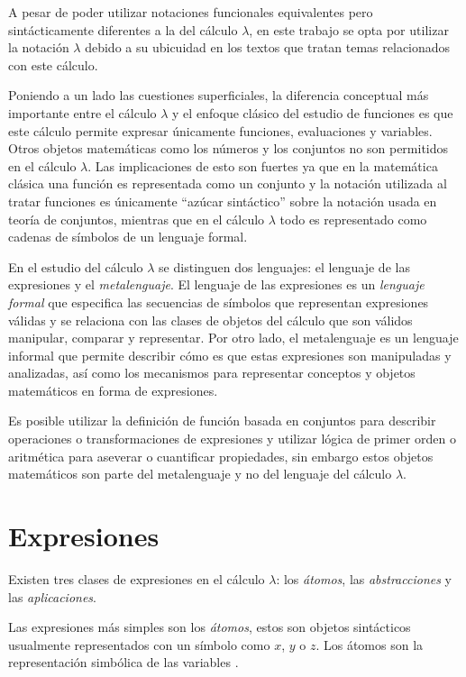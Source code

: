 A pesar de poder utilizar notaciones funcionales equivalentes pero sintácticamente diferentes a la del cálculo \( λ \), en este trabajo se opta por utilizar la notación \( λ \) debido a su ubicuidad en los textos que tratan temas relacionados con este cálculo.

Poniendo a un lado las cuestiones superficiales, la diferencia conceptual más importante entre el cálculo \( λ \) y el enfoque clásico del estudio de funciones es que este cálculo permite expresar únicamente funciones, evaluaciones y variables. Otros objetos matemáticas como los números y los conjuntos no son permitidos en el cálculo \( λ \). Las implicaciones de esto son fuertes ya que en la matemática clásica una función es representada como un conjunto y la notación utilizada al tratar funciones es únicamente ``azúcar sintáctico'' sobre la notación usada en teoría de conjuntos, mientras que en el cálculo \( λ \) todo es representado como cadenas de símbolos de un lenguaje formal.

En el estudio del cálculo \( λ \) se distinguen dos lenguajes: el lenguaje de las expresiones y el \emph{metalenguaje}. El lenguaje de las expresiones es un \emph{lenguaje formal} que especifica las secuencias de símbolos que representan expresiones válidas y se relaciona con las clases de objetos del cálculo que son válidos manipular, comparar y representar. Por otro lado, el metalenguaje es un lenguaje informal que permite describir cómo es que estas expresiones son manipuladas y analizadas, así como los mecanismos para representar conceptos y objetos matemáticos en forma de expresiones.

Es posible utilizar la definición de función basada en conjuntos para describir operaciones o transformaciones de expresiones y utilizar lógica de primer orden o aritmética para aseverar o cuantificar propiedades, sin embargo estos objetos matemáticos son parte del metalenguaje y no del lenguaje del cálculo \( λ \).

\section{Expresiones}
\label{sec:expresiones}

Existen tres clases de expresiones en el cálculo \( λ \): los \emph{átomos}, las \emph{abstracciones} y las \emph{aplicaciones}.

Las expresiones más simples son los \emph{átomos}, estos son objetos sintácticos usualmente representados con un símbolo como \( x \), \( y \) o \( z \). Los átomos son la representación simbólica de las variables \cite[p.~577]{Barendregt:Bible}.

